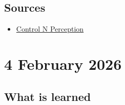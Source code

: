 \documentclass{article}
\begin{document}
\subsection{Sources}
\begin{itemize}
    \item \href{https://docs.google.com/presentation/d/1eWFVnwYogy59CXYhC1RoQxCGd3fFAj4huDb7gDz-0bs/edit?slide=id.g3c2a5a9cf04_3_12#slide=id.g3c2a5a9cf04_3_12}{Control N Perception}
\end{itemize}

\section{4 February 2026}

\subsection{What is learned}
\end{document}
